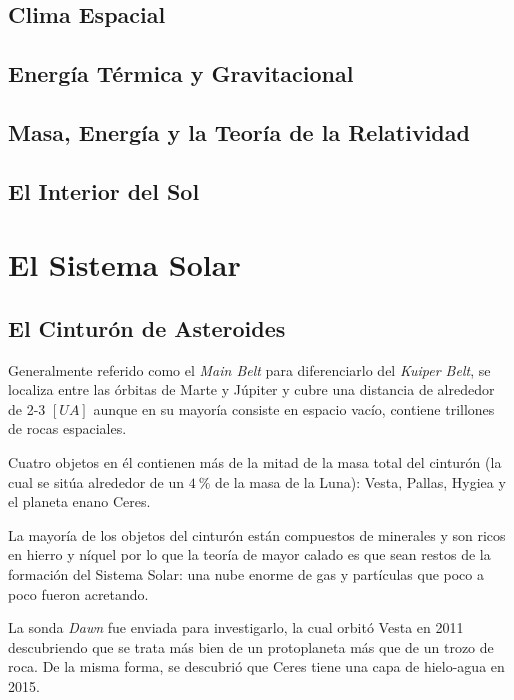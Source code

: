 \documentclass{tufte-handout}
\begin{document}
\subsection{Clima Espacial}

\subsection{Energía Térmica y Gravitacional}

\subsection{Masa, Energía y la Teoría de la Relatividad}

\subsection{El Interior del Sol}

\clearpage

\section{El Sistema Solar}

\subsection{El Cinturón de Asteroides}

Generalmente referido como el \emph{Main Belt} para diferenciarlo del \emph{Kuiper Belt}, se localiza entre las órbitas de Marte y Júpiter y cubre una distancia de alrededor de 2-3 $[UA]$ aunque en su mayoría consiste en espacio vacío, contiene trillones de rocas espaciales.

Cuatro objetos en él contienen más de la mitad de la masa total del cinturón (la cual se sitúa alrededor de un $4~\%$ de la masa de la Luna): Vesta, Pallas, Hygiea y el planeta enano Ceres.

La mayoría de los objetos del cinturón están compuestos de minerales y son ricos en hierro y níquel por lo que la teoría de mayor calado es que sean restos de la formación del Sistema Solar: una nube enorme de gas y partículas que poco a poco fueron acretando.

La sonda \emph{Dawn} fue enviada para investigarlo, la cual orbitó Vesta en 2011 descubriendo que se trata más bien de un protoplaneta más que de un trozo de roca. De la misma forma, se descubrió que Ceres tiene una capa de hielo-agua en 2015.
\end{document}
